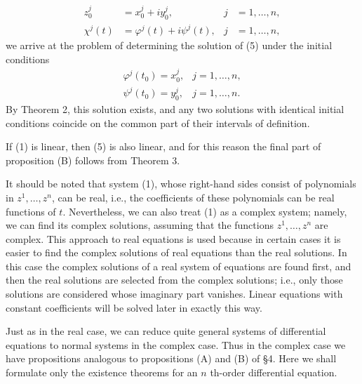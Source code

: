 \documentclass[10pt,a5paper]{book}
\theoremstyle{plain}
\theoremstyle{definition}
\theoremstyle{remark}
\begin{document}
\[
\begin{aligned}
z_{0}^{j} & =x_{0}^{j}+i y_{0}^{j}, & j & =1, \ldots, n, \\
\chi^{j}(t) & =\varphi^{j}(t)+i \psi^{j}(t), & j & =1, \ldots, n,
\end{aligned}
\]
we arrive at the problem of determining the solution of (5) under the initial conditions
\[
\begin{array}{ll}
\varphi^{j}\left(t_{0}\right)=x_{0}^{j}, & j=1, \ldots, n, \\
\psi^{j}\left(t_{0}\right)=y_{0}^{j}, & j=1, \ldots, n .
\end{array}
\]
By Theorem 2, this solution exists, and any two solutions with identical initial conditions coincide on the common part of their intervals of definition.

If (1) is linear, then (5) is also linear, and for this reason the final part of proposition (B) follows from Theorem 3.

It should be noted that system (1), whose right-hand sides consist of polynomials in $z^{1}, \ldots, z^{n}$, can be real, i.e., the coefficients of these polynomials can be real functions of $t$. Nevertheless, we can also treat (1) as a complex system; namely, we can find its complex solutions, assuming that the functions $z^{1}, \ldots, z^{n}$ are complex. This approach to real equations is used because in certain cases it is easier to find the complex solutions of real equations than the real solutions. In this case the complex solutions of a real system of equations are found first, and then the real solutions are
selected from the complex solutions; i.e., only those solutions are considered whose imaginary part vanishes. Linear equations with constant coefficients will be solved later in exactly this way.

Just as in the real case, we can reduce quite general systems of differential equations to normal systems in the complex case. Thus in the complex case we have propositions analogous to propositions (A) and (B) of §4. Here we shall formulate only the existence theorems for an $n$ th-order differential equation.
\end{document}
